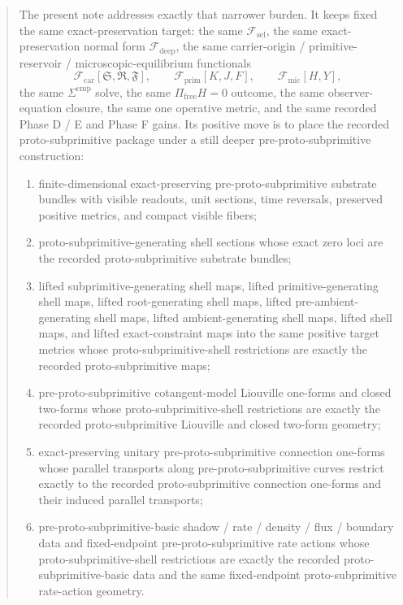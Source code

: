 \documentclass[11pt]{article}
\newcommand{\GaugeAux}{Y}
\newcommand{\MicFunctional}{\mathscr F_{\mathrm{mic}}}
\newcommand{\PrimFunctional}{\mathscr F_{\mathrm{prim}}}
\newcommand{\CarrierFunctional}{\mathscr F_{\mathrm{car}}}
\newcommand{\DeepFunctional}{\mathscr F_{\mathrm{deep}}}
\newcommand{\StemFunctional}{\mathscr F_{\mathrm{sel}}}
\newcommand{\PrimStrain}{K}
\newcommand{\PrimNeutral}{J}
\newcommand{\PrimFree}{F}
\newcommand{\CarrierSeed}{\mathfrak S}
\newcommand{\RelabelSeed}{\mathfrak R}
\newcommand{\FreeSeed}{\mathfrak F}
\begin{document}
\begin{abstract}
The present note addresses exactly that narrower burden. It keeps fixed the same exact-preservation target: the same \(\StemFunctional\), the same exact-preservation normal form \(\DeepFunctional\), the same carrier-origin / primitive-reservoir / microscopic-equilibrium functionals
\[
\CarrierFunctional[\CarrierSeed,\RelabelSeed,\FreeSeed],\qquad
\PrimFunctional[\PrimStrain,\PrimNeutral,\PrimFree],\qquad
\MicFunctional[H,\GaugeAux],
\]
the same \(\Sigma^{\mathrm{cmp}}\) solve, the same \(\Pi_{\mathrm{free}}H=0\) outcome, the same observer-equation closure, the same one operative metric, and the same recorded Phase D / E and Phase F gains. Its positive move is to place the recorded proto-subprimitive package under a still deeper pre-proto-subprimitive construction:
\begin{enumerate}
    \item finite-dimensional exact-preserving pre-proto-subprimitive substrate bundles with visible readouts, unit sections, time reversals, preserved positive metrics, and compact visible fibers;
    \item proto-subprimitive-generating shell sections whose exact zero loci are the recorded proto-subprimitive substrate bundles;
    \item lifted subprimitive-generating shell maps, lifted primitive-generating shell maps, lifted root-generating shell maps, lifted pre-ambient-generating shell maps, lifted ambient-generating shell maps, lifted shell maps, and lifted exact-constraint maps into the same positive target metrics whose proto-subprimitive-shell restrictions are exactly the recorded proto-subprimitive maps;
    \item pre-proto-subprimitive cotangent-model Liouville one-forms and closed two-forms whose proto-subprimitive-shell restrictions are exactly the recorded proto-subprimitive Liouville and closed two-form geometry;
    \item exact-preserving unitary pre-proto-subprimitive connection one-forms whose parallel transports along pre-proto-subprimitive curves restrict exactly to the recorded proto-subprimitive connection one-forms and their induced parallel transports;
    \item pre-proto-subprimitive-basic shadow / rate / density / flux / boundary data and fixed-endpoint pre-proto-subprimitive rate actions whose proto-subprimitive-shell restrictions are exactly the recorded proto-subprimitive-basic data and the same fixed-endpoint proto-subprimitive rate-action geometry.
\end{enumerate}


\end{abstract}
\end{document}
